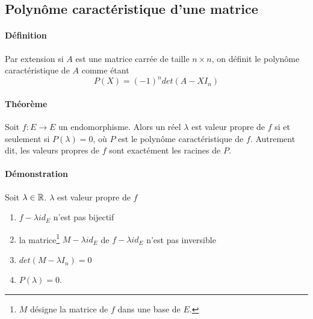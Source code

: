 %
\subsection{Polynôme caractéristique d'une matrice}
%
\paragraph{Définition} Par extension si $A$ est une matrice carrée de taille $n\times n$, on définit le polynôme caractéristique de $A$ comme étant
$$P(X) = (-1)^n det(A -X I_n)$$

\paragraph{Théorème} Soit $f: E \rightarrow E$ un endomorphisme. Alors un réel $\lambda$ est valeur propre de $f$ si et seulement si $P(\lambda) = 0$, où $P$ est le polynôme caractéristique de $f$. Autrement dit, les valeurs propres de $f$ sont exactément les racines de $P$.

\paragraph{Démonstration} Soit $\lambda \in \mathbb{R}$. $\lambda$ est valeur propre de $f$
\begin{enumerate}[$\Leftrightarrow$]
  \item $f - \lambda id_E$ n'est pas bijectif 
  \item la matrice\footnote{$M$ désigne la matrice de $f$ dans une base de $E$.} $M- \lambda id_E$ de $f- \lambda id_E$ n'est pas inversible
  \item $det(M - \lambda I_n) = 0$
  \item $P(\lambda) = 0$.
\end{enumerate}

